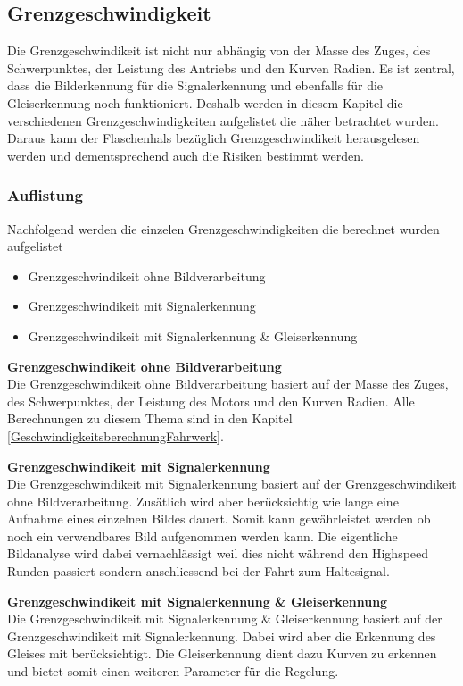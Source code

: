 \documentclass[../../main.tex]{subfiles}
\begin{document}
\subsection{Grenzgeschwindigkeit}
Die Grenzgeschwindikeit ist nicht nur abhängig von der Masse des Zuges, des Schwerpunktes, der Leistung des Antriebs und den Kurven Radien.
Es ist zentral, dass die Bilderkennung für die Signalerkennung und ebenfalls für die Gleiserkennung noch funktioniert.
Deshalb werden in diesem Kapitel die verschiedenen Grenzgeschwindigkeiten aufgelistet die näher betrachtet wurden.
Daraus kann der Flaschenhals bezüglich Grenzgeschwindikeit herausgelesen werden und dementsprechend auch die Risiken
bestimmt werden.

\subsubsection{Auflistung}
Nachfolgend werden die einzelen Grenzgeschwindigkeiten die berechnet wurden aufgelistet
\begin{itemize} %
    \item Grenzgeschwindikeit ohne Bildverarbeitung
    \item Grenzgeschwindikeit mit Signalerkennung
    \item Grenzgeschwindikeit mit Signalerkennung \& Gleiserkennung
\end{itemize}

\textbf{Grenzgeschwindikeit ohne Bildverarbeitung} \\
Die Grenzgeschwindikeit ohne Bildverarbeitung basiert auf der Masse des Zuges, des Schwerpunktes, der Leistung des Motors und den Kurven Radien.
Alle Berechnungen zu diesem Thema sind in den Kapitel \ref{GeschwindigkeitsberechnungFahrwerk}.

\textbf{Grenzgeschwindikeit mit Signalerkennung} \\
Die Grenzgeschwindikeit mit Signalerkennung basiert auf der Grenzgeschwindikeit ohne Bildverarbeitung. Zusätlich wird aber berücksichtig wie lange eine
Aufnahme eines einzelnen Bildes dauert. Somit kann gewährleistet werden ob noch ein verwendbares Bild aufgenommen werden kann. Die eigentliche Bildanalyse
wird dabei vernachlässigt weil dies nicht während den Highspeed Runden passiert sondern anschliessend bei der Fahrt zum Haltesignal.

\textbf{Grenzgeschwindikeit mit Signalerkennung \& Gleiserkennung} \\
Die Grenzgeschwindikeit mit Signalerkennung \& Gleiserkennung basiert auf der Grenzgeschwindikeit mit Signalerkennung. Dabei wird aber die Erkennung des Gleises
mit berücksichtigt. Die Gleiserkennung dient dazu Kurven zu erkennen und bietet somit einen weiteren Parameter für die Regelung.
\end{document}
